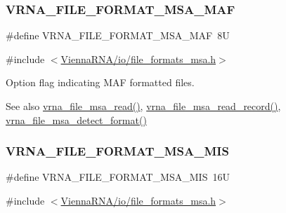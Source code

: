 \subsubsection{\texorpdfstring{V\+R\+N\+A\+\_\+\+F\+I\+L\+E\+\_\+\+F\+O\+R\+M\+A\+T\+\_\+\+M\+S\+A\+\_\+\+M\+AF}{VRNA\_FILE\_FORMAT\_MSA\_MAF}}
{\footnotesize\ttfamily \#define V\+R\+N\+A\+\_\+\+F\+I\+L\+E\+\_\+\+F\+O\+R\+M\+A\+T\+\_\+\+M\+S\+A\+\_\+\+M\+AF~8U}



{\ttfamily \#include $<$\hyperlink{io_2file__formats__msa_8h}{Vienna\+R\+N\+A/io/file\+\_\+formats\+\_\+msa.\+h}$>$}



Option flag indicating M\+AF formatted files. 

\begin{DoxySeeAlso}{See also}
\hyperlink{group__file__formats__msa_ga08a01c40ac5f5e0e04e9ae2258c99aa6}{vrna\+\_\+file\+\_\+msa\+\_\+read()}, \hyperlink{group__file__formats__msa_ga59204cd1daa4927f5127cc65a2886efd}{vrna\+\_\+file\+\_\+msa\+\_\+read\+\_\+record()}, \hyperlink{group__file__formats__msa_ga627ac281b5f11c63861726e6472626c9}{vrna\+\_\+file\+\_\+msa\+\_\+detect\+\_\+format()} 
\end{DoxySeeAlso}
\mbox{\label{group__file__formats__msa_ga494488a771aa0c602fb4cf445be34d47}} 
\subsubsection{\texorpdfstring{V\+R\+N\+A\+\_\+\+F\+I\+L\+E\+\_\+\+F\+O\+R\+M\+A\+T\+\_\+\+M\+S\+A\+\_\+\+M\+IS}{VRNA\_FILE\_FORMAT\_MSA\_MIS}}
{\footnotesize\ttfamily \#define V\+R\+N\+A\+\_\+\+F\+I\+L\+E\+\_\+\+F\+O\+R\+M\+A\+T\+\_\+\+M\+S\+A\+\_\+\+M\+IS~16U}



{\ttfamily \#include $<$\hyperlink{io_2file__formats__msa_8h}{Vienna\+R\+N\+A/io/file\+\_\+formats\+\_\+msa.\+h}$>$}



